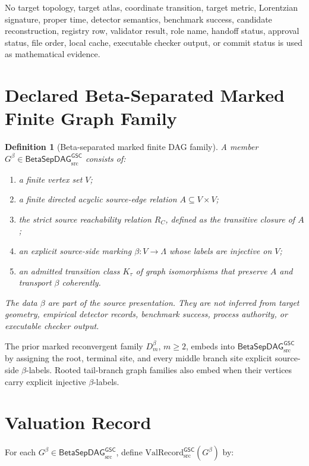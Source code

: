 \documentclass[11pt]{article}
\newcommand{\ValRecord}{\mathrm{ValRecord}_{\mathrm{src}}^{\mathsf{GSC}}}
\newcommand{\BetaGraph}{\mathsf{BetaSepDAG}_{\mathrm{src}}^{\mathsf{GSC}}}
\newtheorem{definition}{Definition}
\begin{document}
No target topology, target atlas, coordinate transition, target metric,
Lorentzian signature, proper time, detector semantics, benchmark success,
candidate reconstruction, registry row, validator result, role name, handoff
status, approval status, file order, local cache, executable checker output,
or commit status is used as mathematical evidence.

\section{Declared Beta-Separated Marked Finite Graph Family}

\begin{definition}[Beta-separated marked finite DAG family]
A member \(G^\beta\in\BetaGraph\) consists of:
\begin{enumerate}[leftmargin=*]
  \item a finite vertex set \(V\);
  \item a finite directed acyclic source-edge relation \(A\subseteq V\times V\);
  \item the strict source reachability relation \(R_C\), defined as the
  transitive closure of \(A\);
  \item an explicit source-side marking \(\beta:V\to\Lambda\) whose labels are
  injective on \(V\);
  \item an admitted transition class \(K_\tau\) of graph isomorphisms that
  preserve \(A\) and transport \(\beta\) coherently.
\end{enumerate}
The data \(\beta\) are part of the source presentation. They are not inferred
from target geometry, empirical detector records, benchmark success, process
authority, or executable checker output.
\end{definition}

The prior marked reconvergent family \(D_m^\beta\), \(m\ge2\), embeds into
\(\BetaGraph\) by assigning the root, terminal site, and every middle branch
site explicit source-side \(\beta\)-labels. Rooted tail-branch graph families
also embed when their vertices carry explicit injective \(\beta\)-labels.

\section{Valuation Record}

For each \(G^\beta\in\BetaGraph\), define \(\ValRecord(G^\beta)\) by:
\end{document}
